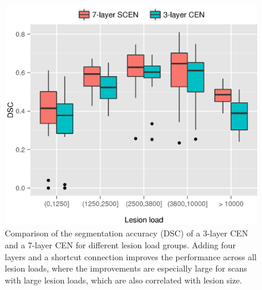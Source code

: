 
\begin{figure}[tb]
\centering
\includegraphics[width=\columnwidth]{figures/boxplot_L1vsL2}

\caption{Comparison of the segmentation accuracy (DSC) of a 3-layer CEN and a
7-layer CEN for different lesion load groups. Adding four layers and a shortcut
connection improves the performance across all lesion loads, where the
improvements are especially large for scans with large lesion loads, which are
also correlated with lesion size.}

\label{fig:l1vl2}
\end{figure}

